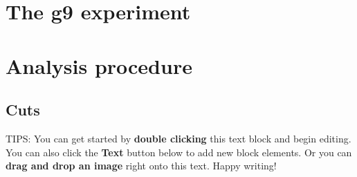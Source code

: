 
\tableofcontents

\section{The g9 experiment}
\section{Analysis procedure}
\subsection{Cuts}



TIPS:
You can get started by \textbf{double clicking} this text block and begin editing. You can also click the \textbf{Text} button below to add new block elements. Or you can \textbf{drag and drop an image} right onto this text. Happy writing!
